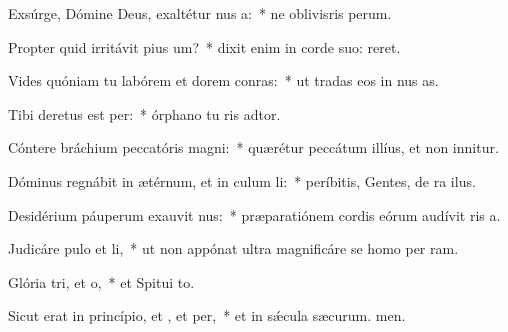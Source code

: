 \item Exsúrge, Dómine Deus, exaltétur nus a:~* ne oblivisris perum.
\item Propter quid irritávit pius um?~* dixit enim in corde suo:  reret.
\item Vides quóniam tu labórem et dorem conras:~* ut tradas eos in nus as.
\item Tibi deretus est per:~* órphano tu ris adtor.
\item Cóntere bráchium peccatóris  magni:~* quærétur peccátum illíus, et non innitur.
\item Dóminus regnábit in ætérnum, et in culum li:~* períbitis, Gentes, de ra ilus.
\item Desidérium páuperum exauvit nus:~* præparatiónem cordis eórum audívit ris a.
\item Judicáre pulo et li,~* ut non appónat ultra magnificáre se homo per ram.
\item Glória tri, et o,~* et Spitui to.
\item Sicut erat in princípio, et , et per,~* et in sǽcula sæcurum. men.
